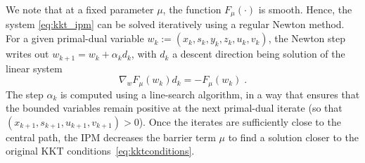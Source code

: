 We note that at a fixed parameter $\mu$, the function $F_\mu(\cdot)$
is smooth. Hence, the system \eqref{eq:kkt_ipm} can be solved iteratively
using a regular Newton method. For a given primal-dual variable
$w_k := (x_k, s_k, y_k, z_k, u_k, v_k)$, the Newton step writes out
$w_{k+1} = w_k + \alpha_k d_k$, with $d_k$ a descent
direction being solution of the linear system
\begin{equation}
  \label{eq:newton_step}
  \nabla_w F_{\mu}(w_k) d_k = -F_{\mu}(w_k) \; .
\end{equation}
The step $\alpha_k$ is computed using a line-search algorithm, in a way
that ensures that the bounded variables remain positive
at the next primal-dual iterate (so that $(x_{k+1}, s_{k+1}, u_{k+1}, v_{k+1}) > 0$).
Once the iterates are sufficiently close to the central path,
the IPM decreases the barrier term $\mu$ to find a solution closer to
the original KKT conditions~\eqref{eq:kktconditions}.

